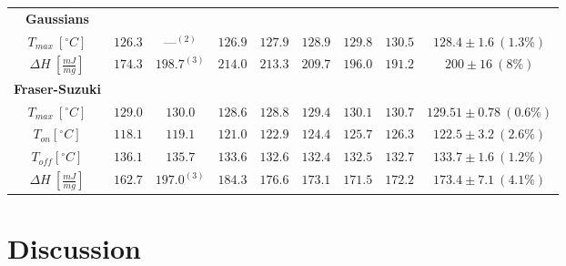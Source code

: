 \documentclass{scrartcl}[12pt, halfparskip]
\numberwithin{equation}{section}
\numberwithin{figure}{section}
\numberwithin{table}{section}
\begin{document}
\begin{table}[H]
\begin{tabular}{| c | c | c | c | c | c | c | c || c |}
		\textbf{Gaussians} & & & & & & & & \\[0.7ex]
		$T_{max} \ [^{\circ}C]$ & $126.3$ & ---$^{(2)}$ & $126.9$ & $127.9$ & $128.9$ & $129.8$ & $130.5$ & $128.4 \pm 1.6 \ (1.3\%)$ \\[0.7ex]
		$\Delta H \ [\frac{mJ}{mg}]$ & $174.3$ & $198.7^{(3)}$ & $214.0$ & $213.3$ & $209.7$ & $196.0$ & $191.2$ & $200 \pm 16 \ (8\%)$ \\ \hline
		
		
		\textbf{Fraser-Suzuki} & & & & & & & & \\[0.7ex]
		$T_{max} \ [^{\circ}C]$ & $129.0$ & $130.0$ & $128.6$ & $128.8$ & $129.4$ & $130.1$ & $130.7$ & $129.51 \pm 0.78 \ (0.6\%)$ \\[0.7ex]
		$T_{on} [^{\circ} C]$ & $118.1$ & $119.1$ & $121.0$ & $122.9$ & $124.4$ & $125.7$ & $126.3$ & $122.5 \pm 3.2 \ (2.6\%)$ \\[0.7ex]
		$T_{off} [^{\circ} C]$ & $136.1$ & $135.7$ & $133.6$ & $132.6$ & $132.4$ & $132.5$ & $132.7$ & $133.7 \pm 1.6 \ (1.2\%)$ \\[0.7ex]
		$\Delta H \ [\frac{mJ}{mg}]$ & $162.7$ & $197.0^{(3)}$ & $184.3$ & $176.6$ & $173.1$ & $171.5$ & $172.2$ & $173.4 \pm 7.1 \ (4.1\%)$ \\ \hline
	\end{tabular}
	\label{tab:eval_table_summary}
\end{table}




\newpage
\section{Discussion}
\label{sec:discussion}
\end{document}
